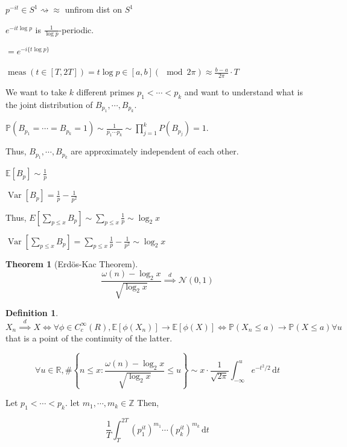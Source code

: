 \documentclass{article}
\theoremstyle{definition}
\newtheorem*{definition}{Definition}
\newtheorem{theorem}{Theorem}
\begin{document}
    \(p^{-it} \in S^1 \rightsquigarrow \approx\) unfirom dist on \(S^1\)  
    
    \(e^{-it \log p}\) is \(\frac{1}{\log p}\)-periodic.

    \(= e^{-i \{ t\log p \} }\) 

    \(\operatorname{meas}(t\in [T,2T]) = t \log p \in [a,b] (\mod 2\pi) \approx \frac{b-a}{2\pi} \cdot T\) 

    We want to take \(k\) different primes \(p_1 < \cdots < p_k\) and want to understand what is the joint distribution of \(B_{p_1}, \cdots , B_{p_k}\).

    \(\mathbb{P}(B_{p_1} = \cdots = B_{p_{k}} = 1) \sim \frac{1}{p_1 \cdots p_k} \sim \prod_{j=1}^{k} P(B_{p_j}) = 1\).
    
    Thus, \(B_{p_1}, \cdots , B_{p_k}\) are approximately independent of each other.

    \(\mathbb{E}[B_p] \sim \frac{1}{p}\) 

    \(\operatorname{Var}[B_p] = \frac{1}{p} - \frac{1}{p^2} \)
    
    Thus, \(E[\sum_{p \leq x} B_p] \sim \sum_{p \leq x} \frac{1}{p} \sim \log_2 x\)
    
    \(\operatorname{Var}[\sum_{p \leq x} B_p] = \sum_{p \leq x} \frac{1}{p} - \frac{1}{p^2} \sim \log_2 x\) 

    \begin{theorem}
        [Erd\"os-Kac Theorem]

        \[
            \frac{\omega(n) - \log_2 x}{\sqrt{\log_2 x}} \overset{d}{\implies} \mathcal{N}(0,1)
        \]
    \end{theorem}

    \begin{definition}
        \(X_n \overset{d}{\implies} X \iff \forall \phi \in C_c^{\infty} (R), \mathbb{E}[\phi(X_n)] \to \mathbb{E}[\phi(X)] \iff \mathbb{P}(X_n \leq a) \to \mathbb{P} (X \leq a) \forall u\) that is a point of the continuity of the latter.
    \end{definition}

    \[
        \forall u\in \mathbb{R} , \# \left\{ n \leq x : \frac{\omega(n) - \log_2 x}{\sqrt{\log_2 x} } \leq u \right\} \sim x \cdot \frac{1}{\sqrt{2\pi}} \int_{-\infty}^{u} e^{-t^2 / 2} \,\mathrm{d}t 
    \]

    Let \(p_1 < \cdots < p_k\). let \(m_1, \cdots , m_k \in \mathbb{Z}\) Then,

    \[
        \frac{1}{T} \int_{T}^{2T} (p_1^{it})^{m_1} \cdots (p_k^{it})^{m_k} \,\mathrm{d}t 
    \]
\end{document}
